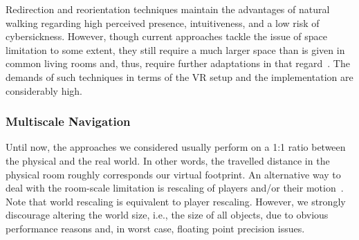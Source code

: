 Redirection and reorientation techniques maintain the advantages of natural walking regarding high perceived presence, intuitiveness, and a low risk of cybersickness. However, though current approaches tackle the issue of space limitation to some extent, they still require a much larger space than is given in common living rooms and, thus, require further adaptations in that regard~\cite{Grechkin:2016:RDT:2931002.2931018, engel2008psychophysically, langbehn2016subliminal,bruder2009arch}. 
The demands of such techniques in terms of the VR setup and the implementation are considerably high.









\subsubsection{Multiscale Navigation}

Until now, the approaches we considered usually perform on a 1:1 ratio between the physical and the real world. In other words, the travelled distance in the physical room roughly corresponds our virtual footprint. An alternative way to deal with the room-scale limitation is rescaling of players and/or their motion~\cite{Bhandari:2017:LSW:3139131.3139133}. Note that world rescaling is equivalent to player rescaling. However, we strongly discourage altering the world size, i.e., the size of all objects, due to obvious performance reasons and, in worst case, floating point precision issues.

